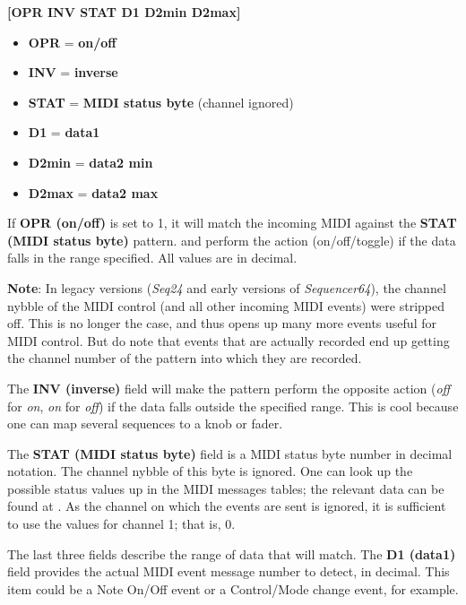       \textbf{[OPR INV STAT D1 D2min D2max]}

   \begin{itemize}
      \item \textbf{OPR} = \textbf{on/off}
      \item \textbf{INV} = \textbf{inverse}
      \item \textbf{STAT} = \textbf{MIDI status byte} (channel ignored) 
      \item \textbf{D1} = \textbf{data1}
      \item \textbf{D2min} = \textbf{data2 min}
      \item \textbf{D2max} = \textbf{data2 max}
   \end{itemize}

   If \textbf{OPR (on/off)} is set to 1, it will match the incoming MIDI
   against the \textbf{STAT (MIDI status byte)} pattern.
   and perform the action (on/off/toggle) if the data
   falls in the range specified.  All values are in decimal.

   \textbf{Note}: In legacy versions (\textsl{Seq24} and early versions
   of \textsl{Sequencer64}), the channel nybble of the MIDI control (and all
   other incoming MIDI events) were stripped off.
   This is no longer the case, and thus opens up many more events useful for
   MIDI control.   But do note that events that are actually recorded end up
   getting the channel number of the pattern into which they are recorded.

   The \textbf{INV (inverse)} field will make the pattern perform the opposite
   action (\textsl{off} for \textsl{on}, \textsl{on} for \textsl{off}) if the
   data falls outside the specified range.  This is cool because one can map
   several sequences to a knob or fader.

   The \textbf{STAT (MIDI status byte)} field is a MIDI status byte number in
   decimal notation.  The channel nybble of this byte is ignored.  One can look
   up the possible status values up in the MIDI messages tables; the relevant
   data can be found at \cite{midicontroltable}.  As the channel on which the
   events are sent is ignored, it is sufficient to use the values for channel
   1; that is, 0.

   The last three fields describe the range of data that will match.  The
   \textbf{D1 (data1)} field provides the actual MIDI event message number to
   detect, in decimal.  This item could be a Note On/Off event or a
   Control/Mode change event, for example.

